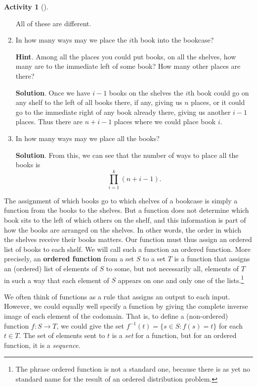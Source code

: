 \documentclass[10pt,]{book}
\newcommand{\terminology}[1]{\textbf{#1}}
\theoremstyle{plain}
\theoremstyle{definition}
\theoremstyle{definition}
\theoremstyle{definition}
\newtheorem{activity}[project]{Activity}
\theoremstyle{definition}
\numberwithin{equation}{chapter}
\def\inv{^{-1}}
\def\st{:}
\begin{document}
\begin{activity}[]
\begin{enumerate}[font=\bfseries,label=(\alph*),ref=\alph*]
\hypertarget{p-740}{}%
All of these are different.%
\item\label{task-96} \hypertarget{p-741}{}%
In how many ways may we place the \(i\)th book into the bookcase?%
\par\smallskip%
\noindent\textbf{Hint}.\hypertarget{hint-58}{}\quad%
\hypertarget{p-742}{}%
Among all the places you could put books, on all the shelves, how many are to the immediate left of some book? How many other places are there?%
\par\smallskip%
\noindent\textbf{Solution}.\hypertarget{solution-68}{}\quad%
\hypertarget{p-743}{}%
Once we have \(i-1\) books on the shelves the \(i\)th book could go on any shelf to the left of all books there, if any, giving us \(n\) places, or it could go to the immediate right of any book already there, giving us another \(i-1\) places. Thus there are \(n+i-1\) places where we could place book  \(i\).%
\item\label{task-97} \hypertarget{p-744}{}%
In how many ways may we place all the books?%
\par\smallskip%
\noindent\textbf{Solution}.\hypertarget{solution-69}{}\quad%
\hypertarget{p-745}{}%
From this, we can see that the number of ways to place all the books is%
\begin{equation*}
\prod_{i=1}^k (n+i-1).
\end{equation*}
%
\end{enumerate}
\end{activity}
\hypertarget{p-746}{}%
The assignment of which books go to which shelves of a bookcase is simply a function from the books to the shelves. But a function does not determine which book sits to the left of which others on the shelf, and this information is part of how the books are arranged on the shelves. In other words, the order in which the shelves receive their books matters.  Our function must thus assign an ordered list of books to each shelf. We will call such a function an ordered function. More precisely, an \terminology{ordered function} from a set \(S\) to a set \(T\) is a function that assigns an (ordered) list of elements of \(S\) to some, but not necessarily all, elements of \(T\) in such a way that each element of \(S\) appears on one and only one of the lists.\footnote{The phrase ordered function is not a standard one, because there is as yet no standard name for the result of an ordered distribution problem.\label{fn-6}}%
\par
\hypertarget{p-747}{}%
We often think of functions as a rule that assigns an output to each input.  However, we could equally well specify a function by giving the complete inverse image of each element of the codomain.  That is, to define a (non-ordered) function \(f:S \to T\), we could give the set \(f\inv(t) = \{s \in S \st f(s) = t\}\) for each \(t \in T\).  The set of elements sent to \(t\) is a \emph{set} for a function, but for an ordered function, it is a \emph{sequence}.%
\end{document}
